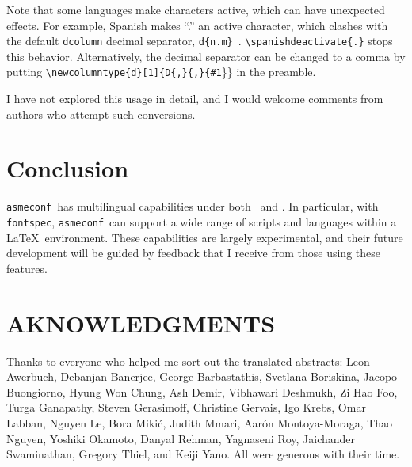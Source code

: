 \documentclass[colorlinks,nofoot,fontspec,spanish,japanese,russian,greek,ukrainian,vietnamese,french,portuguese,turkish,polish,indonesian,italian,german,latin,serbianc,bidi=basic]{asmeconf}
\newcommand*\FS{{\upshape\texttt{fontspec}}}
\newcommand*\LLT{{\upshape\LuaLaTeX}}
\newcommand*\AC{{\upshape\texttt{asmeconf}}}
\newcommand*\PLT{{\upshape\texttt{\hologo{pdfLaTeX}}}}
\begin{document}
Note that some languages make characters active, which can have unexpected effects. For example, Spanish makes ``.'' an active character, which clashes with the default \texttt{dcolumn} decimal separator, \texttt{d\{n.m\}}~\cite{dpc}. \texttt{\textbackslash spanishdeactivate\{.\}} stops this behavior. Alternatively, the decimal separator can be changed to a comma by putting \texttt{\textbackslash newcolumntype\{d\}[1]\{D\{,\}\{,\}\{\#1}\}\} in the preamble.

I have not explored this usage in detail, and I would welcome comments from authors who attempt such conversions.


\section{Conclusion}
\AC\ has multilingual capabilities under both \PLT\ and \LLT.  In particular, with \FS, \AC\ can support a wide range of scripts and languages within a \LaTeX\ environment. These capabilities are largely experimental, and their future development will be guided by feedback that I receive from those using these features.


\section{AKNOWLEDGMENTS}
Thanks to everyone who helped me sort out the translated abstracts: Leon Awerbuch, Debanjan Banerjee, George Barbastathis, Svetlana Boriskina, Jacopo Buongiorno, Hyung Won Chung, Aslı Demir, Vibhawari Deshmukh, Zi Hao Foo, Turga Ganapathy, Steven Gerasimoff, Christine Gervais, Igo Krebs, Omar Labban, Nguyen Le, Bora Mikić, Judith Mmari, Aarón Montoya-Moraga, Thao Nguyen, Yoshiki Okamoto, Danyal Rehman, Yagnaseni Roy, Jaichander Swaminathan, Gregory Thiel, and Keiji Yano. All were generous with their time.



\end{document}

